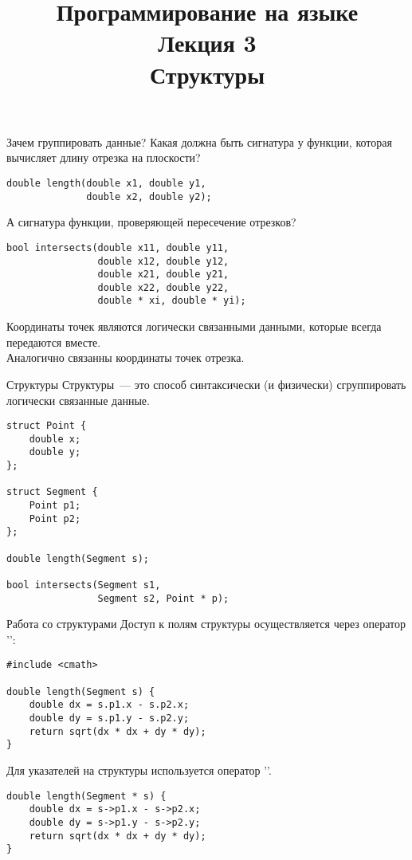 \documentclass{beamer}
\title{{\bf Программирование на языке \langcpp\protect\\Лекция
3\protect\vspace{1em}\\}Структуры}
\begin{document}
\begin{frame} 
  \titlepage
\end{frame}

\begin{frame}[fragile]{Зачем группировать данные?}
    Какая должна быть сигнатура у функции, которая вычисляет длину отрезка на
    плоскости?
\begin{lstlisting}
double length(double x1, double y1, 
              double x2, double y2);
\end{lstlisting}
    А сигнатура функции, проверяющей пересечение отрезков?
\begin{lstlisting}
bool intersects(double x11, double y11, 
                double x12, double y12,
                double x21, double y21, 
                double x22, double y22,
                double * xi, double * yi);
\end{lstlisting}
Координаты точек являются логически связанными данными, которые всегда передаются
вместе.\\
Аналогично связанны координаты точек отрезка.
\end{frame}

\begin{frame}[fragile]{Структуры}
    Структуры~--- это способ синтаксически (и физически)
    сгруппировать логически связанные данные.
\begin{lstlisting}
struct Point {
    double x;
    double y;
};

struct Segment {
    Point p1;
    Point p2;
};

double length(Segment s);  

bool intersects(Segment s1, 
                Segment s2, Point * p);
\end{lstlisting}
\end{frame}

\begin{frame}[fragile]{Работа со структурами}
Доступ к полям структуры осуществляется через
оператор '':
\begin{lstlisting}
#include <cmath>

double length(Segment s) {
    double dx = s.p1.x - s.p2.x;
    double dy = s.p1.y - s.p2.y;
    return sqrt(dx * dx + dy * dy);
}
\end{lstlisting}
Для указателей на структуры используется оператор '\code{->}'.
\begin{lstlisting}
double length(Segment * s) {
    double dx = s->p1.x - s->p2.x;
    double dy = s->p1.y - s->p2.y;
    return sqrt(dx * dx + dy * dy);
}
\end{lstlisting}
\end{frame}
\end{document}
